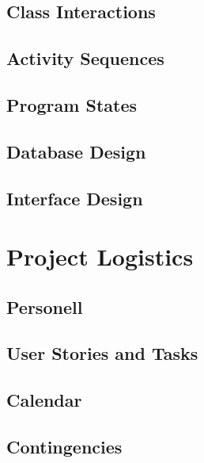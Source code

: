 \documentclass[12pt]{article}
\begin{document}
\subsection{Class Interactions}


\subsection{Activity Sequences}


\subsection{Program States}


\subsection{Database Design}


\subsection{Interface Design}




\section{Project Logistics}

\subsection{Personell}


\subsection{User Stories and Tasks}


\subsection{Calendar}


\subsection{Contingencies}

\end{document}
